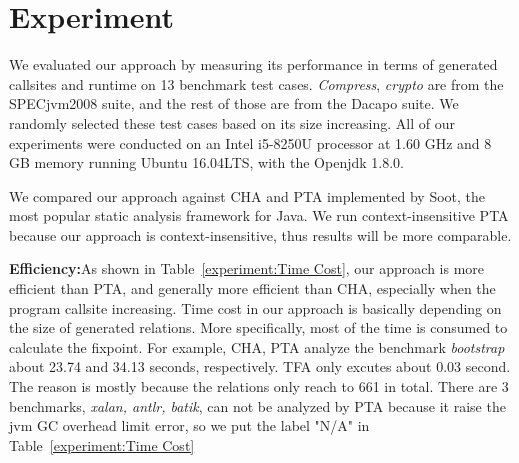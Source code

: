 \documentclass{llncs}
\begin{document}
\section{Experiment}\label{sec:experiment}

We evaluated our approach by measuring its performance in terms of generated callsites and runtime on 13 benchmark test cases. \textit{Compress}, \textit{crypto} are from the SPECjvm2008 suite, and the rest of those are from the Dacapo suite. We randomly selected these test cases based on its size increasing.
All of our experiments were conducted on an Intel i5-8250U processor at 1.60 GHz and 8 GB memory running Ubuntu 16.04LTS, with the Openjdk 1.8.0.

We compared our approach against CHA and PTA implemented by Soot, the most popular static analysis framework for Java. We run context-insensitive PTA because our approach is context-insensitive, thus results will be more comparable.

\textbf{Efficiency:}As shown in Table~\ref{experiment:Time Cost}, our approach is more efficient than PTA, and generally more efficient than CHA, especially when the program callsite increasing. Time cost in our approach is basically depending on the size of generated relations. More specifically, most of the time is consumed to calculate the fixpoint. For example, CHA, PTA analyze the benchmark \textit{bootstrap} about 23.74 and 34.13 seconds, respectively. TFA only excutes about 0.03 second. The reason is mostly because the relations only reach to 661 in total. There are 3 benchmarks, \textit{xalan, antlr, batik}, can not be analyzed by PTA because it raise the jvm GC overhead limit error, so we put the label "N/A" in Table~\ref{experiment:Time Cost}
\end{document}
